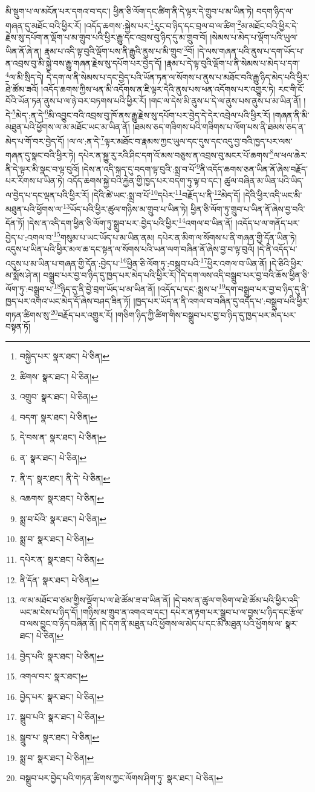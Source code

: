 མི་སྡུག་པ་ལ་མངོན་པར་དགའ་བ་དང་། ཕྱིན་ཅི་ལོག་དང་ཚིག་ནི་དེ་ལྟར་དེ་གྲུབ་པ་མ་ཡིན་ཏེ། བདག་ཉིད་ལ་གཞན་དུ་མཐོང་བའི་ཕྱིར་རོ། །འདོད་ཆགས་:སྐྱེས་པར་\footnote{བསྐྱེད་པར་  སྣར་ཐང་།  པེ་ཅིན། }རུང་བ་ཉིད་དང་བྲལ་བ་ལ་ཚིག་\footnote{ཚིགས་  སྣར་ཐང་།  པེ་ཅིན། }མ་མཐོང་བའི་ཕྱིར་དེ་རྗེས་སུ་དཔོག་ན་ལྡོག་པ་མ་གྲུབ་པའི་ཕྱིར་རྒྱུ་དང་འབྲས་བུ་ཉིད་དུ་མ་གྲུབ་བོ། །སེམས་པ་མེད་པ་ལྡོག་པའི་ཡུལ་ཡིན་ནོ་ཞེ་ན། རྣམ་པ་འདི་ལྟ་བུའི་ལྡོག་པས་ནི་རྒྱུའི་ནུས་པ་མི་གྲུབ་\footnote{འགྲུབ་  སྣར་ཐང་།  པེ་ཅིན། }བོ། །དེ་ལས་གཞན་པའི་ནུས་པ་དག་ཡོད་པ་ན་འབྲས་བུ་མི་སྐྱེ་བས་རྒྱུ་གཞན་རྗེས་སུ་དཔོག་པར་བྱེད་དོ། །རྣམ་པ་དེ་ལྟ་བུའི་ལྡོག་པ་ནི་སེམས་པ་མེད་པ་དག་\footnote{བདག་  སྣར་ཐང་།  པེ་ཅིན། }ལ་མི་སྲིད་དེ། དེ་དག་ལ་ནི་སེམས་པ་དང་བྱེད་པའི་ཡོན་ཏན་ལ་སོགས་པ་ནུས་པ་མཐོང་བའི་རྒྱུ་ཉིད་མེད་པའི་ཕྱིར་ཐེ་ཚོམ་ཟའོ། །འདོད་ཆགས་ཀྱིས་ཕན་མི་འདོགས་ན་ཇི་ལྟར་དེའི་ནུས་པས་ཕན་འདོགས་པར་འགྱུར་ཏེ། རང་གི་ངོ་བོའི་ཡོན་ཏན་ནུས་པ་ལ་ཉེ་བར་བཏགས་པའི་ཕྱིར་རོ། །གང་ལ་དེས་མི་ནུས་པ་དེ་ལ་ནུས་པས་ནུས་པ་མ་ཡིན་ནོ། །དེ་\footnote{དེ་བས་ན་  སྣར་ཐང་།  པེ་ཅིན། }མེད་:ན་དེ་\footnote{ན་  སྣར་ཐང་།  པེ་ཅིན། }མི་འབྱུང་བའི་འབྲས་བུ་ཁོ་ནས་རྒྱུ་རྗེས་སུ་དཔོག་པར་བྱེད་དེ་དེར་འབྲེལ་པའི་ཕྱིར་རོ། །གཞན་ནི་མི་མཐུན་པའི་ཕྱོགས་ལ་མ་མཐོང་ཡང་མ་ཡིན་ནོ། །ཐམས་ཅད་གཟིགས་པའི་གཟིགས་པ་ལོག་པས་ནི་ཐམས་ཅད་ན་མེད་པ་གོ་བར་བྱེད་དོ། །ལ་ལ་:ན་དེ་\footnote{ནི་ད་  སྣར་ཐང་། ནི་དེ་  པེ་ཅིན། }ལྟར་མཐོང་བ་རྣམས་ཀྱང་ཡུལ་དང་དུས་དང་འདུ་བྱ་བའི་ཁྱད་པར་ལས་གཞན་དུ་སྣང་བའི་ཕྱིར་ཏེ། དཔེར་ན་སྐྱུ་རུ་རའི་ཤིང་དག་འོ་མས་བཅུས་ན་འབྲས་བུ་མངར་པོ་ཆགས་\footnote{འཆགས་  སྣར་ཐང་།  པེ་ཅིན། }ལ་ཕལ་ཆེར་ནི་དེ་ལྟར་མི་སྣང་བ་ལྟ་བུའོ། །དེས་ན་འདི་སྐད་དུ་བདག་ལྟ་བུའི་:སྨྲ་བ་པོ་\footnote{སྨྲ་བ་པོའི་  སྣར་ཐང་།  པེ་ཅིན། }ནི་འདོད་ཆགས་ཅན་ཡིན་ནོ་ཞེས་བརྗོད་པར་རིགས་པ་ཡིན་ཏེ། འདོད་ཆགས་སྐྱེ་བའི་རྐྱེན་གྱི་ཁྱད་པར་བདག་ཏུ་ལྟ་བ་དང་། ཚུལ་བཞིན་མ་ཡིན་པའི་ཡིད་ལ་བྱེད་པ་དང་ལྡན་པའི་ཕྱིར་རོ། །དེའི་ཚེ་ཡང་:སྨྲ་བ་པོ་\footnote{སྨྲ་བ་  སྣར་ཐང་།  པེ་ཅིན། }དཔེར་\footnote{དཔེར་ན་  སྣར་ཐང་།  པེ་ཅིན། }བརྗོད་པ་ནི་\footnote{ནི་དོན་  སྣར་ཐང་།  པེ་ཅིན། }མེད་དོ། །དེའི་ཕྱིར་འདི་ཡང་མི་མཐུན་པའི་ཕྱོགས་ལ་\footnote{ལ་མ་མཐོང་བ་ཙམ་གྱིས་ལྡོག་པ་ལ་ཐེ་ཚོམ་ཟ་བ་ཡིན་ནོ། །དེ་བས་ན་ཚུལ་གཅིག་ལ་ཐེ་ཚོམ་པའི་ཕྱིར་འདི་ཡང་མ་ངེས་པ་ཉིད་དོ། །གཉིས་མ་གྲུབ་ན་འགའ་བ་དང་། དཔེར་ན་རྟག་པར་སྒྲུབ་པ་ལ་བྱས་པ་ཉིད་དང་རྩོལ་བ་ལས་བྱུང་བ་ཉིད་བཞིན་ནོ། །དེ་དག་ནི་མཐུན་པའི་ཕྱོགས་ལ་མེད་པ་དང་མི་མཐུན་པའི་ཕྱོགས་ལ་  སྣར་ཐང་།  པེ་ཅིན། }ཡོད་པའི་ཕྱིར་ཚུལ་གཉིས་མ་གྲུབ་པ་ཡིན་ཏེ། ཕྱིན་ཅི་ལོག་ཏུ་གྲུབ་པ་ཡིན་ནོ་ཞེས་བྱ་བའི་དོན་ཏོ། །དེས་ན་འདི་དག་ཕྱིན་ཅི་ལོག་ཏུ་སྒྲུབ་པར་:བྱེད་པའི་ཕྱིར་\footnote{བྱེད་པའི་  སྣར་ཐང་།  པེ་ཅིན། }འགལ་བ་ཡིན་ནོ། །འདོད་པ་ལ་གནོད་པར་བྱེད་པ་:འགལ་བ་\footnote{འགལ་བར་  སྣར་ཐང་། }གསུམ་པ་ཡང་ཡོད་པ་མ་ཡིན་ནམ། དཔེར་ན་མིག་ལ་སོགས་པ་ནི་གཞན་གྱི་དོན་ཡིན་ཏེ། འདུས་པ་ཡིན་པའི་ཕྱིར་མལ་ཆ་དང་སྟན་ལ་སོགས་པའི་ཡན་ལག་བཞིན་ནོ་ཞེས་བྱ་བ་ལྟ་བུའོ། །དེ་ནི་འདོད་པ་འདུས་པ་མ་ཡིན་པ་གཞན་གྱི་དོན་:བྱེད་པ་\footnote{བྱེད་པར་  སྣར་ཐང་།  པེ་ཅིན། }ཕྱིན་ཅི་ལོག་ཏུ་:བསྒྲུབ་པའི་\footnote{སྒྲུབ་པའི་  སྣར་ཐང་།  པེ་ཅིན། }ཕྱིར་འགལ་བ་ཡིན་ནོ། །དེ་ཅིའི་ཕྱིར་མ་སྨོས་ཤེ་ན། བསྒྲུབ་པར་བྱ་བ་ཉིད་དུ་ཁྱད་པར་མེད་པའི་ཕྱིར་རོ། །དེ་དག་ལས་འདི་བསྒྲུབ་པར་བྱ་བའི་ཆོས་ཕྱིན་ཅི་ལོག་ཏུ་:བསྒྲུབ་པ་\footnote{སྒྲུབ་པ་  སྣར་ཐང་།  པེ་ཅིན། }ཉིད་དུ་ནི་བྱེ་བྲག་ཡོད་པ་མ་ཡིན་ནོ། །འདོད་པ་དང་:སྨྲས་པ་\footnote{སྨྲ་བ་  སྣར་ཐང་།  པེ་ཅིན། }དག་བསྒྲུབ་པར་བྱ་བ་ཉིད་དུ་ནི་ཁྱད་པར་འགའ་ཡང་མེད་དོ་ཞེས་བཤད་ཟིན་ཏོ། །ཁྱད་པར་ཡོད་ན་ནི་འགལ་བ་བཞིན་དུ་འདོད་པ་:བསྒྲུབ་པའི་ཕྱིར་གཏན་ཚིགས་སུ་\footnote{བསྒྲུབ་པར་བྱེད་པའི་གཏན་ཚིགས་ཀྱང་ལོགས་ཤིག་ཏུ་  སྣར་ཐང་།  པེ་ཅིན། }བརྗོད་པར་འགྱུར་རོ། །གཅིག་ཉིད་ཀྱི་ཚིག་གིས་བསྒྲུབ་པར་བྱ་བ་ཉིད་དུ་ཁྱད་པར་མེད་པར་བསྟན་ཏོ། 